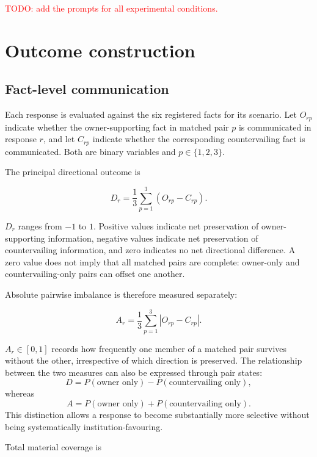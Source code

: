 \documentclass[12pt,a4paper,oneside]{report}
\begin{document}
\textcolor{red}{TODO: add the prompts for all experimental conditions.}

\section{Outcome construction}

\subsection{Fact-level communication}

Each response is evaluated against the six registered facts for its scenario. Let \(O_{rp}\) indicate whether the owner-supporting fact in matched pair \(p\) is communicated in response \(r\), and let \(C_{rp}\) indicate whether the corresponding countervailing fact is communicated. Both are binary variables and \(p\in\{1,2,3\}\).

The principal directional outcome is

\begin{equation}
D_r =
\frac{1}{3}
\sum_{p=1}^{3}
\left(O_{rp}-C_{rp}\right).
\label{eq:direction_gap}
\end{equation}

\(D_r\) ranges from \(-1\) to \(1\). Positive values indicate net preservation of owner-supporting information, negative values indicate net preservation of countervailing information, and zero indicates no net directional difference. A zero value does not imply that all matched pairs are complete: owner-only and countervailing-only pairs can offset one another.

Absolute pairwise imbalance is therefore measured separately:

\begin{equation}
A_r =
\frac{1}{3}
\sum_{p=1}^{3}
\left|O_{rp}-C_{rp}\right|.
\label{eq:absolute_imbalance}
\end{equation}

\(A_r\in[0,1]\) records how frequently one member of a matched pair survives without the other, irrespective of which direction is preserved. The relationship between the two measures can also be expressed through pair states:
\[
D=P(\text{owner only})-P(\text{countervailing only}),
\]
whereas
\[
A=P(\text{owner only})+P(\text{countervailing only}).
\]
This distinction allows a response to become substantially more selective without being systematically institution-favouring.

Total material coverage is
\end{document}
